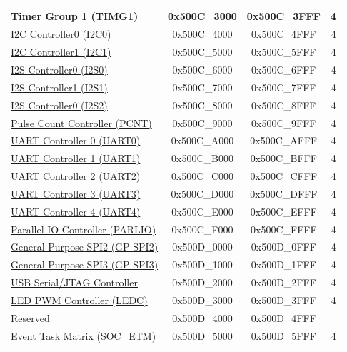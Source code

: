 \begin{ThreePartTable}
\begin{longtable}[c]{ |p{7cm}|c|c|r| }
\hyperref[mod:timg]{Timer Group 1 (TIMG1)}        & 0x500C\_3000 & 0x500C\_3FFF &   4 \\\hline
\hyperref[mod:i2c]{I2C Controller0 (I2C0)}        & 0x500C\_4000 & 0x500C\_4FFF &   4 \\\hline
\hyperref[mod:i2c]{I2C Controller1 (I2C1)}        & 0x500C\_5000 & 0x500C\_5FFF &   4 \\\hline
\hyperref[mod:i2s]{I2S Controller0 (I2S0)}        & 0x500C\_6000 & 0x500C\_6FFF &   4 \\\hline
\hyperref[mod:i2s]{I2S Controller1 (I2S1)}        & 0x500C\_7000 & 0x500C\_7FFF &   4 \\\hline
\hyperref[mod:i2c]{I2S Controller0 (I2S2)}        & 0x500C\_8000 & 0x500C\_8FFF &   4 \\\hline
\hyperref[mod:pcnt]{Pulse Count Controller (PCNT)} & 0x500C\_9000 & 0x500C\_9FFF &   4 \\\hline
\hyperref[mod:uart]{UART Controller 0 (UART0)}    & 0x500C\_A000 & 0x500C\_AFFF &   4 \\\hline
\hyperref[mod:uart]{UART Controller 1 (UART1)}    & 0x500C\_B000 & 0x500C\_BFFF &   4 \\\hline
\hyperref[mod:uart]{UART Controller 2 (UART2)}     & 0x500C\_C000 & 0x500C\_CFFF &   4 \\\hline
\hyperref[mod:uart]{UART Controller 3 (UART3)}     & 0x500C\_D000 & 0x500C\_DFFF &   4 \\\hline
\hyperref[mod:uart]{UART Controller 4 (UART4)}     & 0x500C\_E000 & 0x500C\_EFFF &   4 \\\hline
\hyperref[mod:parlio]{Parallel IO Controller (PARLIO)}       & 0x500C\_F000 & 0x500C\_FFFF &   4 \\\hline
\hyperref[mod:spi]{General Purpose SPI2 (GP-SPI2)} & 0x500D\_0000 & 0x500D\_0FFF &   4 \\\hline
\hyperref[mod:spi]{General Purpose SPI3 (GP-SPI3)} & 0x500D\_1000 & 0x500D\_1FFF &   4 \\\hline
\hyperref[mod:usbserialjtag]{USB Serial/JTAG Controller}       & 0x500D\_2000 & 0x500D\_2FFF &   4 \\\hline
\hyperref[mod:ledpwm]{LED PWM Controller (LEDC)}  & 0x500D\_3000 & 0x500D\_3FFF &   4 \\\hline
\rowcolor{gray!25}  Reserved                      & 0x500D\_4000 & 0x500D\_4FFF &     \\\hline
\hyperref[mod:evntaskmatrix]{Event Task Matrix (SOC\_ETM)}       & 0x500D\_5000 & 0x500D\_5FFF &   4 \\\hline

\end{longtable}
\end{ThreePartTable}

